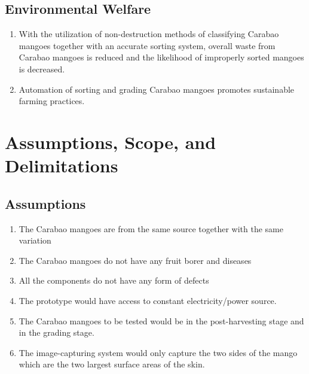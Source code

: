 \subsection{Environmental Welfare}

\begin{enumerate}
	\item With the utilization of non-destruction methods of classifying Carabao mangoes together with an
	accurate sorting system, overall waste from Carabao mangoes is reduced and the likelihood
	of improperly sorted mangoes is decreased.
	
	\item Automation of sorting and grading Carabao mangoes promotes sustainable farming practices.
	
\end{enumerate}



\section{Assumptions, Scope, and Delimitations}

\subsection{Assumptions}

\begin{enumerate}
	\item The Carabao mangoes are from the same source together with the same variation
	
	\item The Carabao mangoes do not have any fruit borer and diseases
	
	\item All the components do not have any form of defects
	\item The prototype would have access to constant electricity/power source.
	\item The Carabao mangoes to be tested would be in the post-harvesting stage and in the grading stage.
	\item The image-capturing system would only capture the two sides of the mango which 
	are the two largest surface areas of the skin.	
\end{enumerate}

